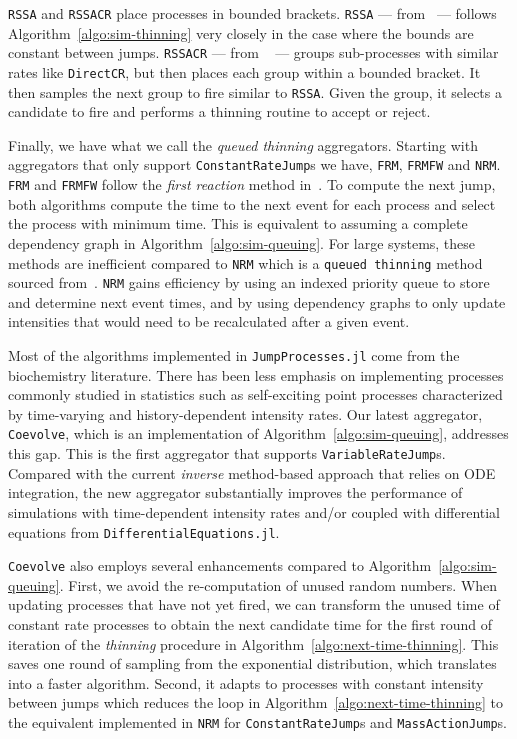 \documentclass{juliacon}
\numberwithin{equation}{section}
\begin{document}
\texttt{RSSA} and \texttt{RSSACR} place processes in bounded brackets. \texttt{RSSA} --- from~\cite{thanh2014} --- follows Algorithm~\ref{algo:sim-thinning} very closely in the case where the bounds are constant between jumps. \texttt{RSSACR} --- from ~\cite{thanh2017} --- groups sub-processes with similar rates like \texttt{DirectCR}, but then places each group within a bounded bracket. It then samples the next group to fire similar to \texttt{RSSA}. Given the group, it selects a candidate to fire and performs a thinning routine to accept or reject.

Finally, we have what we call the \textit{queued thinning} aggregators. Starting with aggregators that only support \texttt{ConstantRateJump}s we have, \texttt{FRM}, \texttt{FRMFW} and \texttt{NRM}. \texttt{FRM} and \texttt{FRMFW} follow the \textit{first reaction} method in~\cite{gillespie1976}. To compute the next jump, both algorithms compute the time to the next event for each process and select the process with minimum time. This is equivalent to assuming a complete dependency graph in Algorithm~\ref{algo:sim-queuing}. For large systems, these methods are inefficient compared to \texttt{NRM} which is a \texttt{queued thinning} method sourced from~\cite{gibson2000}. \texttt{NRM} gains efficiency by using an indexed priority queue to store and determine next event times, and by using dependency graphs to only update intensities that would need to be recalculated after a given event.

Most of the algorithms implemented in \texttt{JumpProcesses.jl} come from the biochemistry literature. There has been less emphasis on implementing processes commonly studied in statistics such as self-exciting point processes characterized by time-varying and history-dependent intensity rates. Our latest aggregator, \texttt{Coevolve}, which is an implementation of Algorithm~\ref{algo:sim-queuing}, addresses this gap. This is the first aggregator that supports \texttt{VariableRateJump}s. Compared with the current \textit{inverse} method-based approach that relies on ODE integration, the new aggregator substantially improves the performance of simulations with time-dependent intensity rates and/or coupled with differential equations from \texttt{DifferentialEquations.jl}.

\texttt{Coevolve} also employs several enhancements compared to Algorithm~\ref{algo:sim-queuing}. First, we avoid the re-computation of unused random numbers. When updating processes that have not yet fired, we can transform the unused time of constant rate processes to obtain the next candidate time for the first round of iteration of the \textit{thinning} procedure in Algorithm~\ref{algo:next-time-thinning}. This saves one round of sampling from the exponential distribution, which translates into a faster algorithm. Second, it adapts to processes with constant intensity between jumps which reduces the loop in Algorithm~\ref{algo:next-time-thinning} to the equivalent implemented in \texttt{NRM} for \texttt{ConstantRateJump}s and \texttt{MassActionJump}s.
\end{document}
